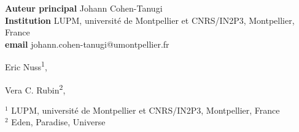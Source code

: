 
\def\altaffilmark#1{\textsuperscript{#1}}
\def\affil#1{\noindent #1 \\}

%

\begin{flushleft}
  {\bf Auteur principal}  Johann Cohen-Tanugi\\
  {\bf Institution}  LUPM, université de Montpellier et CNRS/IN2P3, Montpellier, France\\
  {\bf email} johann.cohen-tanugi@umontpellier.fr
\end{flushleft}       


\begin{raggedright}
\small
Eric Nuss\altaffilmark{1},
\end{raggedright}

\begin{raggedright}
\small
Vera C. Rubin\altaffilmark{2},
\end{raggedright}

\scriptsize

\affil{$^{1}$ LUPM, université de Montpellier et CNRS/IN2P3, Montpellier, France}
\affil{$^{2}$ Eden, Paradise, Universe}

\normalsize
